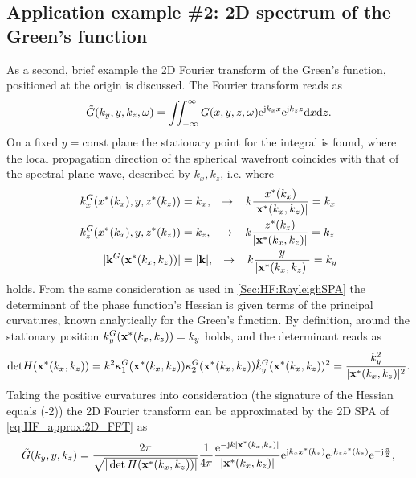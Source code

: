 \subsection*{Application example \#2: 2D spectrum of the Green's function}
\label{Sec:HF_approx:1D_Greens}
As a second, brief example the 2D Fourier transform of the Green's function, positioned at the origin is discussed.
The Fourier transform reads as
\begin{equation}
\label{eq:HF_approx:2D_FFT}
\tilde{G}(k_y,y,k_z,\omega) = \iint^{\infty}_{-\infty} G(x,y,z,\omega) \mathrm{e}^{\mathrm{j} k_x x} \mathrm{e}^{\mathrm{j} k_z z} \mathrm{d} x \mathrm{d} z.
\end{equation}
On a fixed $y = \text{const}$ plane the stationary point for the integral is found, where the local propagation direction of the spherical wavefront coincides with that of the spectral plane wave, described by $k_x, k_z$, i.e. where
\begin{align}
\label{eq:HF_approx:2D_FFT_stat_pos}
k_x^G(x^*(k_x),y,z^*(k_z)) &= k_x, \hspace{3mm} \rightarrow \hspace{3mm} k\frac{x^*(k_x)}{|\mathbf{x}^*(k_x,k_z)|} = k_x \\
k_z^G(x^*(k_x),y,z^*(k_z)) &= k_z, \hspace{3mm} \rightarrow \hspace{3mm} k\frac{z^*(k_z)}{|\mathbf{x}^*(k_x,k_z)|} = k_z \\
|\mathbf{k}^G(\mathbf{x}^*(k_x,k_z))| &= |\mathbf{k}|,  \hspace{3mm} \rightarrow \hspace{3mm} k\frac{y}{|\mathbf{x}^*(k_x,k_z)|} = k_y
\end{align} 
holds.
From the same consideration as used in \ref{Sec:HF:RayleighSPA} the determinant of the phase function's Hessian is given terms of the principal curvatures, known analytically for the Green's function.
By definition, around the stationary position $k_y^G(\mathbf{x}^*(k_x,k_z)) = k_y$ holds, and the determinant reads as
\begin{equation}
\mathrm{det} H(\mathbf{x}^*(k_x,k_z)) = k^2 \kappa^G_1(\mathbf{x}^*(k_x,k_z))\kappa^G_2(\mathbf{x}^*(k_x,k_z)) \hat{k}^G_y(\mathbf{x}^*(k_x,k_z))^2 = \frac{k_y^2}{|\mathbf{x}^*(k_x,k_z)|^2}.
\end{equation}
Taking the positive curvatures into consideration (the signature of the Hessian equals (-2)) the 2D Fourier transform can be approximated by the 2D SPA of \eqref{eq:HF_approx:2D_FFT} as
\begin{equation}
\tilde{G}(k_y,y,k_z) = \frac{2\pi}{\sqrt{|\det H(\mathbf{x}^*(k_x,k_z))|}} \frac{1}{4\pi} \frac{\mathrm{e}^{-\mathrm{j} k |\mathbf{x}^*(k_x,k_z)|}}{|\mathbf{x}^*(k_x,k_z)|} \mathrm{e}^{\mathrm{j} k_x x^*(k_x)} \mathrm{e}^{\mathrm{j} k_z z^*(k_z)} \mathrm{e}^{-\mathrm{j} \frac{\pi}{2}},
\end{equation}
